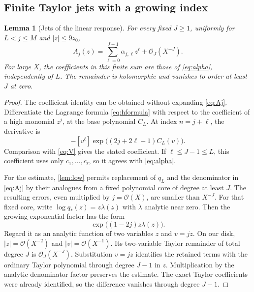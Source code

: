 \documentclass[11pt,a4paper]{article}
\newtheorem{lemma}[theorem]{Lemma}
\theoremstyle{definition}
\numberwithin{equation}{section}
\newcommand{\Oh}{\mathcal O}
\newcommand{\coef}[2]{[#1^{#2}]}
\begin{document}
\subsection{Finite Taylor jets with a growing index}
\begin{lemma}[Jets of the linear response]
\label{lem:jets}
For every fixed $J\ge1$, uniformly for $L<j\le M$ and $|z|\le9z_0$,
\begin{equation}
 A_j(z)=\sum_{\ell=0}^{J-1}\alpha_{j,\ell}z^\ell
                +\Oh_J(X^{-J}).
 \label{eq:Ajjet}
\end{equation}
For large $X$, the coefficients in this finite sum are those of \eqref{eq:alpha}, independently of $L$. The remainder is holomorphic and vanishes to order at least $J$ at zero.
\end{lemma}
\begin{proof}
The coefficient identity can be obtained without expanding \eqref{eq:Aj}. Differentiate the Lagrange formula \eqref{eq:hformula} with respect to the coefficient of a high monomial $z^j$, at the base polynomial $C_L$. At index $n=j+\ell$, the derivative is
\[
 -\coef{v}{\ell}\exp\bigl((2j+2\ell-1)C_L(v)\bigr).
\]
Comparison with \eqref{eq:V} gives the stated coefficient. If $\ell\le J-1\le L$, this coefficient uses only $c_1,\ldots,c_\ell$, so it agrees with \eqref{eq:alpha}.

For the estimate, \cref{lem:low} permits replacement of $q_L$ and the denominator in \eqref{eq:Aj} by their analogues from a fixed polynomial core of degree at least $J$. The resulting errors, even multiplied by $j=\Oh(X)$, are smaller than $X^{-J}$. For that fixed core, write $\log q_*(z)=z\lambda(z)$ with $\lambda$ analytic near zero. Then the growing exponential factor has the form
\[
 \exp\bigl((1-2j)z\lambda(z)\bigr).
\]
Regard it as an analytic function of two variables $z$ and $v=jz$. On our disk, $|z|=\Oh(X^{-2})$ and $|v|=\Oh(X^{-1})$. Its two-variable Taylor remainder of total degree $J$ is $\Oh_J(X^{-J})$. Substitution $v=jz$ identifies the retained terms with the ordinary Taylor polynomial through degree $J-1$ in $z$. Multiplication by the analytic denominator factor preserves the estimate. The exact Taylor coefficients were already identified, so the difference vanishes through degree $J-1$.
\end{proof}
\end{document}
